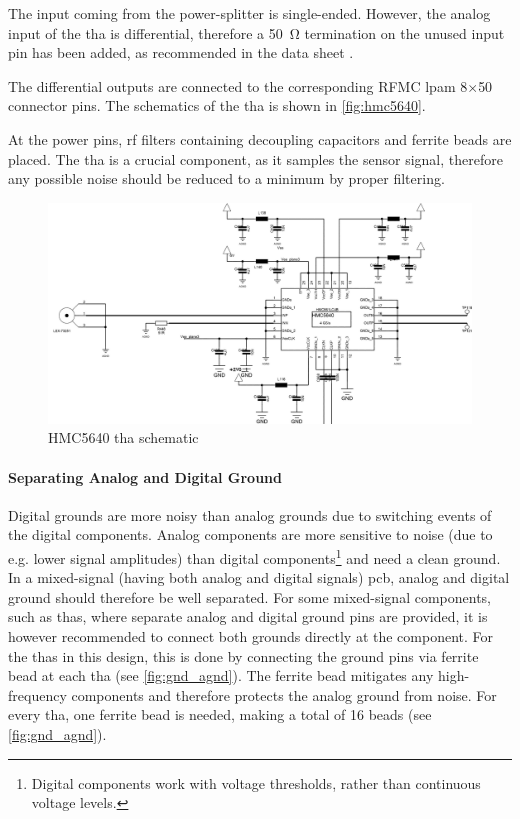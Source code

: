 The input coming from the power-splitter is single-ended.
However, the analog input of the \gls{tha} is differential, therefore a \SI{50}{\ohm} termination on the unused input pin has been added, as recommended in the data sheet \cite{hmc5640}.

The differential outputs are connected to the corresponding RFMC \gls{lpam} 8$\times$50 connector pins.
The schematics of the \gls{tha} is shown in \autoref{fig:hmc5640}.

At the power pins, \gls{rf} filters containing decoupling capacitors and ferrite beads are placed. The \gls{tha} is a crucial component, as it samples the sensor signal, therefore any possible noise should be reduced to a minimum by proper filtering.

\begin{figure}[tb]
	\centering
	\includegraphics[width = \textwidth]{chap/04-theresa/img/schematic/hmc5640}
	\caption[HMC5640 THA schematic]{HMC5640 \gls{tha} schematic}
	\label{fig:hmc5640}
\end{figure}
\clearpage
\paragraph{Separating Analog and Digital Ground}
Digital grounds are more noisy than analog grounds due to switching events of the digital components. 
Analog components are more sensitive to noise (due to e.g. lower signal amplitudes) than digital components\footnote{Digital components work with voltage thresholds, rather than continuous voltage levels.} and need a clean ground.
In a mixed-signal (having both analog and digital signals) \gls{pcb}, analog and digital ground should therefore be well separated.
For some mixed-signal components, such as \glspl{tha}, where separate analog and digital ground pins are provided, it is however recommended to connect both grounds directly at the component.
For the \glspl{tha} in this design, this is done by connecting the ground pins via ferrite bead at each \gls{tha} (see \autoref{fig:gnd_agnd}). 
The ferrite bead mitigates any high-frequency components and therefore protects the analog ground from noise. %
For every \gls{tha}, one ferrite bead is needed, making a total of 16 beads (see \autoref{fig:gnd_agnd}).

